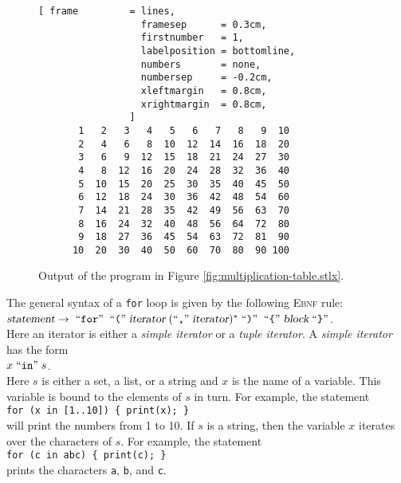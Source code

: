 \begin{figure}[!ht]
\centering
\begin{Verbatim}[ frame         = lines, 
                  framesep      = 0.3cm, 
                  firstnumber   = 1,
                  labelposition = bottomline,
                  numbers       = none,
                  numbersep     = -0.2cm,
                  xleftmargin   = 0.8cm,
                  xrightmargin  = 0.8cm,
                ]
       1   2   3   4   5   6   7   8   9  10
       2   4   6   8  10  12  14  16  18  20
       3   6   9  12  15  18  21  24  27  30
       4   8  12  16  20  24  28  32  36  40
       5  10  15  20  25  30  35  40  45  50
       6  12  18  24  30  36  42  48  54  60
       7  14  21  28  35  42  49  56  63  70
       8  16  24  32  40  48  56  64  72  80
       9  18  27  36  45  54  63  72  81  90
      10  20  30  40  50  60  70  80  90 100
\end{Verbatim}
\vspace*{-0.3cm}
\caption{Output of the program in Figure \ref{fig:multiplication-table.stlx}.}
\label{fig:multiplication-table}
\end{figure}

The general syntax of a \texttt{for} loop is given by the following \textsc{Ebnf} rule:
\\[0.2cm]
\hspace*{1.3cm}
$\textsl{statement} \rightarrow \;\mbox{``\texttt{for}''}\; \;\mbox{``\texttt{(}''}\; \textsl{iterator} \;(\mbox{``\texttt{,}''}\; \textsl{iterator})^* \;\mbox{``\texttt{)}''}\;
  \;\mbox{``\texttt{\{}''}\; \textsl{block} \;\mbox{``\texttt{\}}''}
$.
\\[0.2cm]
Here an iterator is either a \emph{simple iterator} or a \emph{tuple iterator}.  A
\emph{simple iterator} has the form
\\[0.2cm]
\hspace*{1.3cm}
$x \;\mbox{``\texttt{in}''}\; s$.  
\\[0.2cm]
Here $s$ is either a set, a list, or a string and $x$ is the name of a variable.
This variable is bound to the elements of $s$ in turn.  For example,  the statement
\\[0.2cm]
\hspace*{1.3cm}
\texttt{for (x in [1..10]) \{ print(x); \}}
\\[0.2cm]
will print the numbers from 1 to 10.  If $s$ is a string, then the variable $x$ iterates over the
characters of $s$.  For example, the statement
\\[0.2cm]
\hspace*{1.3cm}
\texttt{for (c in abc) \{ print(c); \}}
\\[0.2cm]
prints the characters \texttt{a}, \texttt{b},
and \texttt{c}.  


